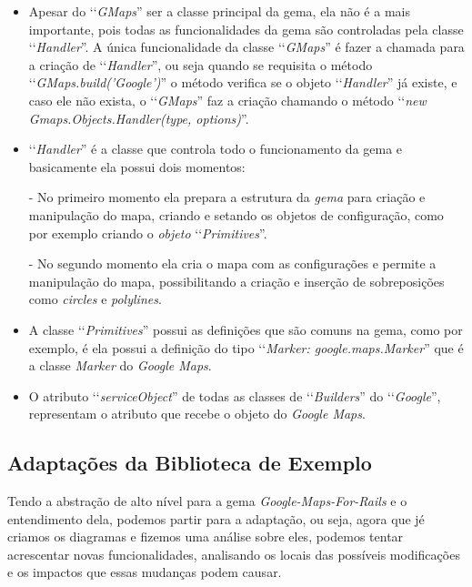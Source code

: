 \begin{itemize}

 \item Apesar do ‘‘\emph{GMaps}'' ser a classe principal da gema, ela não é a mais
 importante, pois todas as funcionalidades da gema são controladas pela classe
 ‘‘\emph{Handler}''. A única funcionalidade da classe ‘‘\emph{GMaps}'' é fazer a chamada
 para a criação de ‘‘\emph{Handler}'', ou seja quando se requisita o método
 ‘‘\emph{GMaps.build('Google')}'' o método verifica se o objeto ‘‘\emph{Handler}'' já
 existe, e caso ele não exista, o ‘‘\emph{GMaps}'' faz a criação chamando o método
 ‘‘\emph{new Gmaps.Objects.Handler(type, options)}''.

 \item ‘‘\emph{Handler}'' é a classe que controla todo o funcionamento da gema e
 basicamente ela possui dois momentos:

  \subitem - No primeiro momento ela prepara a estrutura da \emph{gema} para criação e manipulação
  do mapa, criando e setando os objetos de configuração, como por exemplo criando o \emph{objeto}
  ‘‘\emph{Primitives}''.

  \subitem - No segundo momento ela cria o mapa com as configurações e permite a manipulação do mapa,
  possibilitando a criação e inserção de sobreposições como \emph{circles} e \emph{polylines}.

 \item A classe ‘‘\emph{Primitives}'' possui as definições que são comuns na gema,
 como por exemplo, é ela possui a definição do tipo ‘‘\emph{Marker: google.maps.Marker}'' que
 é a classe \emph{Marker} do \emph{Google Maps}.

 \item O atributo ‘‘\emph{serviceObject}'' de todas as classes de
 ‘‘\emph{Builders}'' do ‘‘\emph{Google}'', representam o atributo que recebe o objeto do
 \emph{Google Maps}.

\end{itemize}


 \subsection{Adaptações da Biblioteca de Exemplo}
 \label{subsection:adaptações_da_biblioteca_de_exemplo}


Tendo a abstração de alto nível para a gema \emph{Google-Maps-For-Rails} e o entendimento dela, podemos
partir para a adaptação, ou seja, agora que jé criamos os diagramas e fizemos uma análise sobre eles,
podemos tentar acrescentar novas funcionalidades, analisando os locais das possíveis modificações e
os impactos que essas mudanças podem causar.

